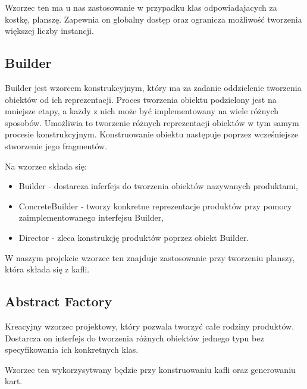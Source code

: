 \documentclass[a4paper, 11pt]{article}
\begin{document}
Wzorzec ten ma u nas zastosowanie w przypadku klas odpowiadajacych za kostkę, planszę. Zapewnia on globalny dostęp oraz ogranicza możliwość tworzenia większej liczby instancji. 

	\subsection{Builder}
	\indent
	
Builder jest wzorcem konstrukcyjnym, który ma za zadanie oddzielenie tworzenia obiektów od ich reprezentacji. 
Proces tworzenia obiektu podzielony jest na mniejsze etapy, a każdy z nich może być implementowany na wiele różnych sposobów. Umożliwia to tworzenie różnych reprezentacji obiektów w tym samym procesie konstrukcyjnym.
Konstruowanie obiektu następuje poprzez wcześniejsze stworzenie jego fragmentów.


Na wzorzec składa się:
\begin{itemize}

\item Builder - dostarcza inferfejs do tworzenia obiektów nazywanych produktami,
\item ConcreteBuilder - tworzy konkretne reprezentacje produktów przy pomocy zaimplementowanego interfejsu Builder,
\item Director - zleca konstrukcję produktów poprzez obiekt Builder.
\end{itemize}

W naszym projekcie wzorzec ten znajduje zastosowanie przy tworzeniu planszy, która składa się z kafli.


	\subsection{Abstract Factory}
\indent

Kreacyjny wzorzec projektowy, który pozwala tworzyć całe rodziny produktów. Dostarcza on interfejs do tworzenia różnych obiektów jednego typu bez specyfikowania ich konkretnych klas.

Wzorzec ten wykorzysytwany będzie przy konstruowaniu kafli oraz generowaniu kart.
\end{document}

